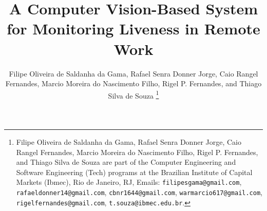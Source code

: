 \documentclass[english,hidelinks]{sbrt}
\begin{document}
\title{
A Computer Vision-Based System for Monitoring Liveness in Remote Work
}

\author{Filipe Oliveira de Saldanha da Gama, Rafael Senra Donner Jorge, Caio Rangel Fernandes, Marcio Moreira do Nascimento Filho, Rigel P. Fernandes, and Thiago Silva de Souza
\thanks{Filipe Oliveira de Saldanha da Gama, Rafael Senra Donner Jorge, Caio Rangel Fernandes, Marcio Moreira do Nascimento Filho, Rigel P. Fernandes, and Thiago Silva de Souza are part of the Computer Engineering and Software Engineering (Tech) programs at the Brazilian Institute of Capital Markets (Ibmec), Rio de Janeiro, RJ, Emails: 
{\tt filipesgama@gmail.com},
{\tt rafaeldonner14@gmail.com},
{\tt cbnr1644@gmail.com},
{\tt warmarcio617@gmail.com},
{\tt rigelfernandes@gmail.com},
{\tt t.souza@ibmec.edu.br}.}
}

\maketitle

\end{document}
